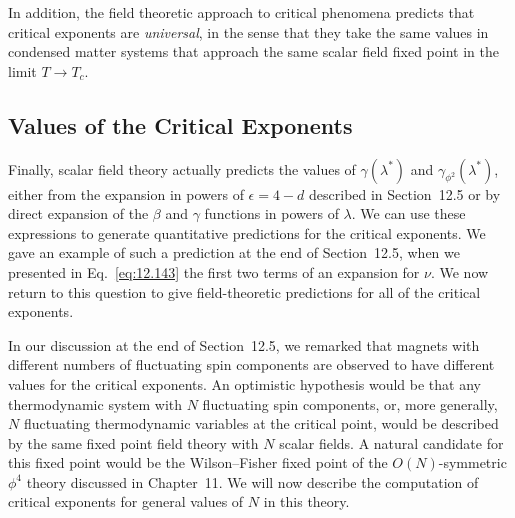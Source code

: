 In addition, the field theoretic approach to critical phenomena predicts that
critical exponents are \emph{universal}, in the sense that they take the same
values in condensed matter systems that approach the same scalar field fixed
point in the limit $T\to T_c$.

\subsection{Values of the Critical Exponents}

Finally, scalar field theory actually predicts the values of
$\gamma(\lambda^{*})$ and $\gamma_{\phi^2}(\lambda^{*})$, either from the
expansion in powers of $\epsilon = 4-d$ described in Section~12.5 or by
direct expansion of the $\beta$ and $\gamma$ functions in powers of
$\lambda$.  We can use these expressions to generate quantitative predictions
for the critical exponents.  We gave an example of such a prediction at the
end of Section~12.5, when we presented in Eq.~\eqref{eq:12.143} the first two
terms of an expansion for $\nu$.  We now return to this question to give
field-theoretic predictions for all of the critical exponents.

In our discussion at the end of Section~12.5, we remarked that magnets with
different numbers of fluctuating spin components are observed to have
different values for the critical exponents.  An optimistic hypothesis would
be that any thermodynamic system with $N$ fluctuating spin components, or,
more generally, $N$ fluctuating thermodynamic variables at the critical
point, would be described by the same fixed point field theory with $N$
scalar fields.  A natural candidate for this fixed point would be the
Wilson--Fisher fixed point of the $O(N)$-symmetric $\phi^4$ theory discussed
in Chapter~11.  We will now describe the computation of critical exponents
for general values of $N$ in this theory.

